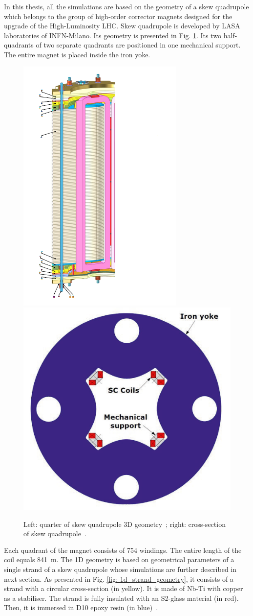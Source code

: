 
In this thesis, all the simulations are based on the geometry of a skew quadrupole which belongs to the group of high-order corrector magnets designed for the upgrade of the High-Luminosity LHC. Skew quadrupole is developed by LASA laboratories of INFN-Milano. Its geometry is presented in Fig. \ref{fig:Skew_quad_geometry}. Its two half-quadrants of two separate quadrants are positioned in one mechanical support. The entire magnet is placed inside the iron yoke. 

\begin{figure}[H]
    \centering
    \includegraphics[width=0.225\linewidth]{sections/1D_quench_modelling/figures/geometry/SkewQuad3D.png}
    \includegraphics[width=0.30\linewidth]{sections/1D_quench_modelling/figures/geometry/Quadrupole_Cross_Section.png}
    \caption{Left: quarter of skew quadrupole 3D geometry~\cite{marco_prioli_mails}; right: cross-section of skew quadrupole~\cite[p.~103-105]{hl_lhc_tech_design_report_v01}.}
    \label{fig:Skew_quad_geometry}
\end{figure}

Each quadrant of the magnet consists of 754 windings. The entire length of the coil equals 841~m. The 1D geometry is based on geometrical parameters of a single strand of a skew quadrupole whose simulations are further described in next section. As presented in Fig. \ref{fig: 1d_strand_geometry}, it consists of a strand with a circular cross-section (in yellow). It is made of Nb-Ti with copper as a stabiliser. The strand is fully insulated with an S2-glass material (in red). Then, it is immersed in D10 epoxy resin (in blue)~\cite[p.~103-105]{hl_lhc_tech_design_report_v01}.

